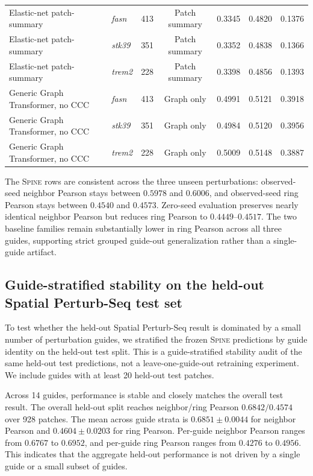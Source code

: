 \documentclass[sigconf,review,balance=false]{acmart}
\newcommand{\methodname}{\textsc{Spine}\xspace}
\begin{document}
\begin{table}[t]
{\begin{tabular}{llrcccc}
Elastic-net patch-summary &
\textit{fasn} &
413 &
Patch summary &
0.3345 &
0.4820 &
0.1376 \\

Elastic-net patch-summary &
\textit{stk39} &
351 &
Patch summary &
0.3352 &
0.4838 &
0.1366 \\

Elastic-net patch-summary &
\textit{trem2} &
228 &
Patch summary &
0.3398 &
0.4856 &
0.1393 \\

Generic Graph Transformer, no CCC &
\textit{fasn} &
413 &
Graph only &
0.4991 &
0.5121 &
0.3918 \\

Generic Graph Transformer, no CCC &
\textit{stk39} &
351 &
Graph only &
0.4984 &
0.5120 &
0.3956 \\

Generic Graph Transformer, no CCC &
\textit{trem2} &
228 &
Graph only &
0.5009 &
0.5148 &
0.3887 \\

\bottomrule
\end{tabular}
}
\end{table}

The \methodname{} rows are consistent across the three unseen perturbations: observed-seed neighbor Pearson stays between $0.5978$ and $0.6006$, and observed-seed ring Pearson stays between $0.4540$ and $0.4573$. Zero-seed evaluation preserves nearly identical neighbor Pearson but reduces ring Pearson to $0.4449$--$0.4517$. The two baseline families remain substantially lower in ring Pearson across all three guides, supporting strict grouped guide-out generalization rather than a single-guide artifact.

\subsection{Guide-stratified stability on the held-out Spatial Perturb-Seq test set}
\label{app:guide_stratified_stability}

To test whether the held-out Spatial Perturb-Seq result is dominated by a small
number of perturbation guides, we stratified the frozen \methodname{} predictions
by guide identity on the held-out test split. This is a guide-stratified stability
audit of the same held-out test predictions, not a leave-one-guide-out retraining
experiment. We include guides with at least 20 held-out test patches.

Across 14 guides, performance is stable and closely matches the overall test result.
The overall held-out split reaches neighbor/ring Pearson $0.6842/0.4574$ over
928 patches. The mean across guide strata is $0.6851 \pm 0.0044$ for neighbor
Pearson and $0.4604 \pm 0.0203$ for ring Pearson. Per-guide neighbor Pearson ranges
from $0.6767$ to $0.6952$, and per-guide ring Pearson ranges from $0.4276$ to
$0.4956$. This indicates that the aggregate held-out performance is not driven by
a single guide or a small subset of guides.
\end{document}

